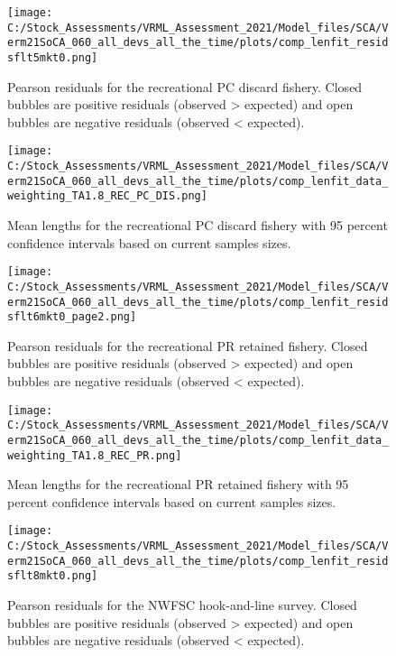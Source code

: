 \documentclass[11pt,
  english,
  a4paper,
]{article}
\begin{document}
\begin{figure}
\centering
\texttt{[image: C:/Stock\_Assessments/VRML\_Assessment\_2021/Model\_files/SCA/Verm21SoCA\_060\_all\_devs\_all\_the\_time/plots/comp\_lenfit\_residsflt5mkt0.png]}
\caption{Pearson residuals for the recreational PC discard fishery. Closed bubbles are positive residuals (observed \textgreater{} expected) and open bubbles are negative residuals (observed \textless{} expected).\label{fig:len-pearson-REC-PC-DIS}}
\end{figure}

\begin{figure}
\centering
\texttt{[image: C:/Stock\_Assessments/VRML\_Assessment\_2021/Model\_files/SCA/Verm21SoCA\_060\_all\_devs\_all\_the\_time/plots/comp\_lenfit\_data\_weighting\_TA1.8\_REC\_PC\_DIS.png]}
\caption{Mean lengths for the recreational PC discard fishery with 95 percent confidence intervals based on current samples sizes.\label{fig:mean-len-fit-REC-PC-DIS}}
\end{figure}

\begin{figure}
\centering
\texttt{[image: C:/Stock\_Assessments/VRML\_Assessment\_2021/Model\_files/SCA/Verm21SoCA\_060\_all\_devs\_all\_the\_time/plots/comp\_lenfit\_residsflt6mkt0\_page2.png]}
\caption{Pearson residuals for the recreational PR retained fishery. Closed bubbles are positive residuals (observed \textgreater{} expected) and open bubbles are negative residuals (observed \textless{} expected).\label{fig:len-pearson-REC-PR}}
\end{figure}

\begin{figure}
\centering
\texttt{[image: C:/Stock\_Assessments/VRML\_Assessment\_2021/Model\_files/SCA/Verm21SoCA\_060\_all\_devs\_all\_the\_time/plots/comp\_lenfit\_data\_weighting\_TA1.8\_REC\_PR.png]}
\caption{Mean lengths for the recreational PR retained fishery with 95 percent confidence intervals based on current samples sizes.\label{fig:mean-len-fit-REC-PR}}
\end{figure}

\begin{figure}
\centering
\texttt{[image: C:/Stock\_Assessments/VRML\_Assessment\_2021/Model\_files/SCA/Verm21SoCA\_060\_all\_devs\_all\_the\_time/plots/comp\_lenfit\_residsflt8mkt0.png]}
\caption{Pearson residuals for the NWFSC hook-and-line survey. Closed bubbles are positive residuals (observed \textgreater{} expected) and open bubbles are negative residuals (observed \textless{} expected).\label{fig:len-pearson-NWFSC-HKL}}
\end{figure}
\end{document}
